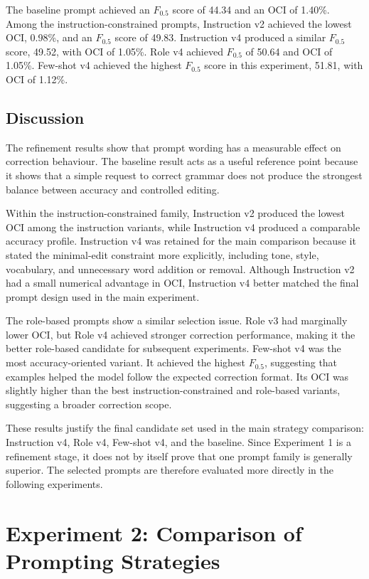 The baseline prompt achieved an $F_{0.5}$ score of 44.34 and an OCI of 1.40\%. Among the instruction-constrained prompts, Instruction v2 achieved the lowest OCI, 0.98\%, and an $F_{0.5}$ score of 49.83. Instruction v4 produced a similar $F_{0.5}$ score, 49.52, with OCI of 1.05\%. Role v4 achieved $F_{0.5}$ of 50.64 and OCI of 1.05\%. Few-shot v4 achieved the highest $F_{0.5}$ score in this experiment, 51.81, with OCI of 1.12\%.

\subsection{Discussion}

The refinement results show that prompt wording has a measurable effect on correction behaviour. The baseline result acts as a useful reference point because it shows that a simple request to correct grammar does not produce the strongest balance between accuracy and controlled editing.

Within the instruction-constrained family, Instruction v2 produced the lowest OCI among the instruction variants, while Instruction v4 produced a comparable accuracy profile. Instruction v4 was retained for the main comparison because it stated the minimal-edit constraint more explicitly, including tone, style, vocabulary, and unnecessary word addition or removal. Although Instruction v2 had a small numerical advantage in OCI, Instruction v4 better matched the final prompt design used in the main experiment.

The role-based prompts show a similar selection issue. Role v3 had marginally lower OCI, but Role v4 achieved stronger correction performance, making it the better role-based candidate for subsequent experiments. Few-shot v4 was the most accuracy-oriented variant. It achieved the highest $F_{0.5}$, suggesting that examples helped the model follow the expected correction format. Its OCI was slightly higher than the best instruction-constrained and role-based variants, suggesting a broader correction scope.

These results justify the final candidate set used in the main strategy comparison: Instruction v4, Role v4, Few-shot v4, and the baseline. Since Experiment 1 is a refinement stage, it does not by itself prove that one prompt family is generally superior. The selected prompts are therefore evaluated more directly in the following experiments.

\section{Experiment 2: Comparison of Prompting Strategies}

